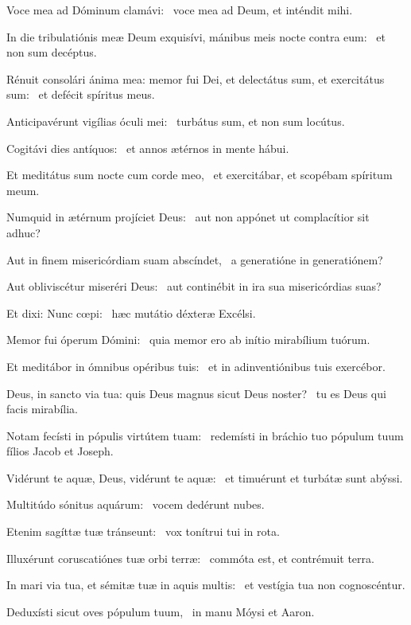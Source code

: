 \item Voce mea ad Dóminum clamávi:~\psstar{} voce mea ad Deum, et inténdit mihi.

\item In die tribulatiónis meæ Deum exquisívi, mánibus meis nocte contra eum:~\psstar{} et non sum decéptus.

\item Rénuit consolári ánima mea: memor fui Dei, et delectátus sum, et exercitátus sum:~\psstar{} et defécit spíritus meus.

\item Anticipavérunt vigílias óculi mei:~\psstar{} turbátus sum, et non sum locútus.

\item Cogitávi dies antíquos:~\psstar{} et annos ætérnos in mente hábui.

\item Et meditátus sum nocte cum corde meo,~\psstar{} et exercitábar, et scopébam spíritum meum.

\item Numquid in ætérnum projíciet Deus:~\psstar{} aut non appónet ut complacítior sit adhuc?

\item Aut in finem misericórdiam suam abscíndet,~\psstar{} a generatióne in generatiónem?

\item Aut obliviscétur miseréri Deus:~\psstar{} aut continébit in ira sua misericórdias suas?

\item Et dixi: Nunc cœpi:~\psstar{} hæc mutátio déxteræ Excélsi.

\item Memor fui óperum Dómini:~\psstar{} quia memor ero ab inítio mirabílium tuórum.

\item Et meditábor in ómnibus opéribus tuis:~\psstar{} et in adinventiónibus tuis exercébor.

\item Deus, in sancto via tua: quis Deus magnus sicut Deus noster?~\psstar{} tu es Deus qui facis mirabília.

\item Notam fecísti in pópulis virtútem tuam:~\psstar{} redemísti in bráchio tuo pópulum tuum fílios Jacob et Joseph.

\item Vidérunt te aquæ, Deus, vidérunt te aquæ:~\psstar{} et timuérunt et turbátæ sunt abýssi.

\item Multitúdo sónitus aquárum:~\psstar{} vocem dedérunt nubes.

\item Etenim sagíttæ tuæ tránseunt:~\psstar{} vox tonítrui tui in rota.

\item Illuxérunt coruscatiónes tuæ orbi terræ:~\psstar{} commóta est, et contrémuit terra.

\item In mari via tua, et sémitæ tuæ in aquis multis:~\psstar{} et vestígia tua non cognoscéntur.

\item Deduxísti sicut oves pópulum tuum,~\psstar{} in manu Móysi et Aaron.